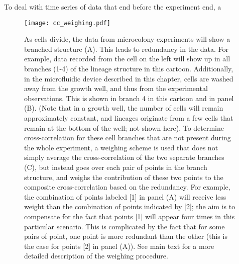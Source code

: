 {To deal with time series of data that end before the experiment end, a


\begin{figure}
	\centering
	\texttt{[image: cc\_weighing.pdf]}
	\caption{ 
		As cells divide, the data from microcolony experiments will show a branched structure (A). 
		This leads to redundancy in the data. 
		For example, data recorded from the cell on the left will show up in all branches (1-4) of the lineage structure in this cartoon.
		Additionally, in the microfluidic device described in this chapter, cells are washed away from the growth well, and thus from the experimental observations. 
		This is shown in branch 4 in this cartoon and in panel (B).
		(Note that in a growth well, the number of cells will remain approximately constant, 
		and lineages originate from a few cells that remain at the bottom of the well; not shown here).
		To determine cross-correlation for these cell branches that are not present during the whole experiment, a weighing scheme is used that does not simply average the cross-correlation of the two separate branches (C), but instead goes over each pair of points in the branch structure, and weighs the contribution of these two points to the composite cross-correlation based on the redundancy. 
		For example, the combination of points labeled [1] in panel (A) will receive less weight than the combination of points indicated by [2]; the aim is to compensate for the fact that points [1] will appear four times in this particular scenario.
		This is complicated by the fact that for some pairs of point, one point is more redundant than the other (this is the case for points [2] in panel (A)). See main text for a more detailed description of the weighing procedure.
	}
	\label{fig:mm:weighingCCs}
\end{figure}

}
